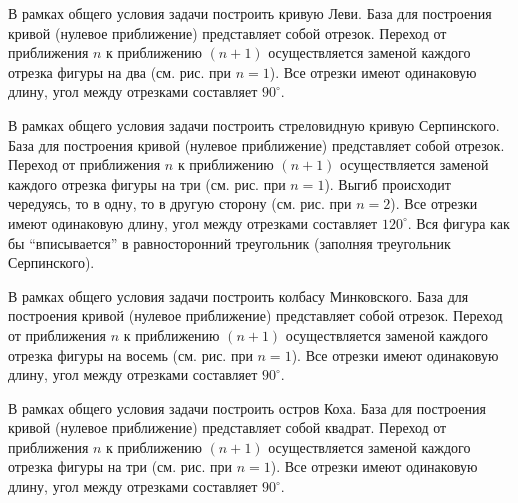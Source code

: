 
\begin{zztask}
В рамках общего условия задачи построить кривую Леви. База для 
построения кривой (нулевое приближение) представляет собой отрезок. Переход 
от приближения $n$ к приближению $(n+1)$ осуществляется заменой каждого 
отрезка фигуры на два (см. рис. при $n=1$). Все отрезки 
имеют одинаковую длину, угол между отрезками составляет $90^\circ$.
\par
\end{zztask}


\begin{zztask}
В рамках общего условия задачи построить стреловидную кривую Серпинского.
База для построения кривой (нулевое приближение) представляет собой отрезок.
Переход от приближения $n$ к приближению $(n+1)$ осуществляется заменой каждого 
отрезка фигуры на три (см. рис. при $n=1$). 
Выгиб происходит чередуясь, то в одну, то в другую сторону (см. рис. при $n=2$).
Все отрезки 
имеют одинаковую длину, угол между отрезками составляет $120^\circ$. Вся фигура
как бы ``вписывается'' в равносторонний треугольник (заполняя треугольник 
Серпинского).
\par
\end{zztask}


\begin{zztask}
В рамках общего условия задачи построить колбасу Минковского.
База для построения кривой (нулевое приближение) представляет собой отрезок.
Переход от приближения $n$ к приближению $(n+1)$ осуществляется заменой каждого 
отрезка фигуры на восемь (см. рис. при $n=1$). 
Все отрезки имеют одинаковую длину, угол между отрезками составляет $90^\circ$.
\par
\end{zztask}


\begin{zztask}
В рамках общего условия задачи построить остров Коха. База для построения кривой 
(нулевое приближение) представляет собой квадрат.
Переход от приближения $n$ к приближению $(n+1)$ осуществляется заменой каждого 
отрезка фигуры на три (см. рис. при $n=1$). 
Все отрезки имеют одинаковую длину, угол между отрезками составляет $90^\circ$.
\par
\end{zztask}

